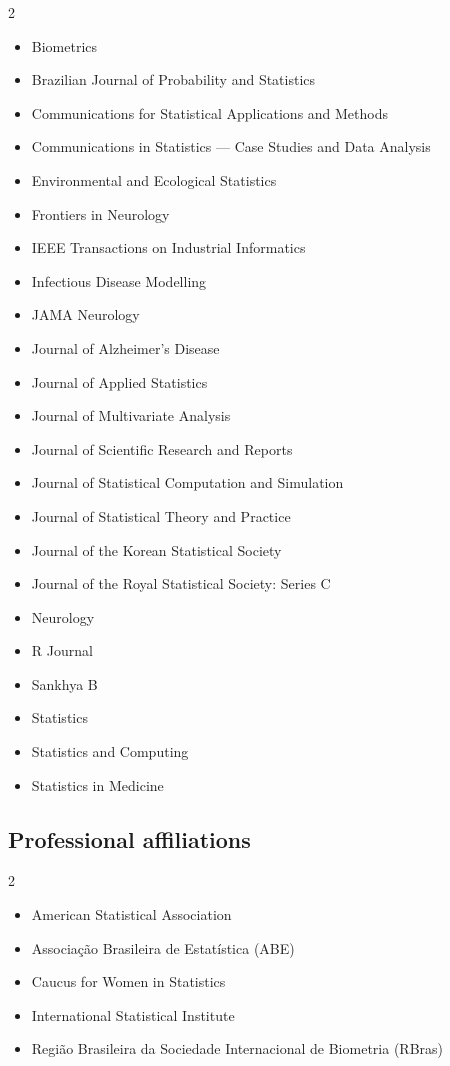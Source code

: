 \documentclass[
  10pt,
  letterpaper,
]{article}
\providecommand{\tightlist}{%
  \setlength{\itemsep}{0pt}\setlength{\parskip}{0pt}}
\begin{document}
\begin{multicols}{2}\raggedright

\begin{itemize}
\tightlist
\item
  Biometrics
\item
  Brazilian Journal of Probability and Statistics
\item
  Communications for Statistical Applications and Methods
\item
  Communications in Statistics --- Case Studies and Data Analysis
\item
  Environmental and Ecological Statistics
\item
  Frontiers in Neurology
\item
  IEEE Transactions on Industrial Informatics
\item
  Infectious Disease Modelling
\item
  JAMA Neurology
\item
  Journal of Alzheimer's Disease
\item
  Journal of Applied Statistics
\item
  Journal of Multivariate Analysis
\item
  Journal of Scientific Research and Reports
\item
  Journal of Statistical Computation and Simulation
\item
  Journal of Statistical Theory and Practice
\item
  Journal of the Korean Statistical Society
\item
  Journal of the Royal Statistical Society: Series C
\item
  Neurology
\item
  R Journal
\item
  Sankhya B
\item
  Statistics
\item
  Statistics and Computing
\item
  Statistics in Medicine
\end{itemize}

\end{multicols}

\subsection{Professional affiliations}\label{professional-affiliations}

\begin{multicols}{2}\raggedright

\begin{itemize}
\tightlist
\item
  American Statistical Association
\item
  Associação Brasileira de Estatística (ABE)
\item
  Caucus for Women in Statistics
\item
  International Statistical Institute
\item
  Região Brasileira da Sociedade Internacional de Biometria (RBras)
\end{itemize}

\end{multicols}
\end{document}
